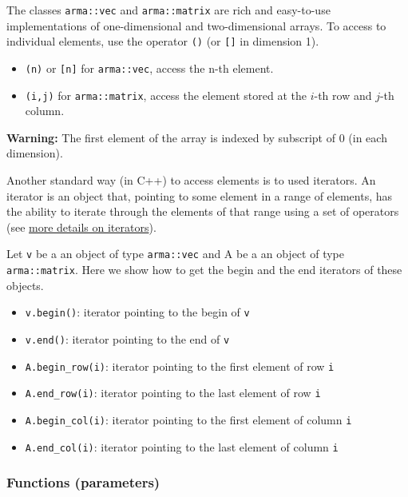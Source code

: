 The classes \texttt{arma::vec} and \texttt{arma::matrix} are rich and easy-to-use implementations of one-dimensional and two-dimensional arrays. To access to individual elements, use the operator \texttt{()} (or \texttt{{[}{]}} in dimension 1).

\begin{itemize}
\tightlist
\item
  \texttt{(n)} or \texttt{{[}n{]}} for \texttt{arma::vec}, access the n-th element.
\item
  \texttt{(i,j)} for \texttt{arma::matrix}, access the element stored at the \(i\)-th row and \(j\)-th column.
\end{itemize}

\textbf{Warning:} The first element of the array is indexed by subscript of 0 (in each dimension).

Another standard way (in C++) to access elements is to used iterators. An iterator is an object that, pointing to some element in a range of elements, has the ability to iterate through the elements of that range using a set of operators (see \href{https://teuder.github.io/rcpp4everyone_en/290_iterator.html}{more details on iterators}).

Let \texttt{v} be a an object of type \texttt{arma::vec} and A be a an object of type \texttt{arma::matrix}. Here we show how to get the begin and the end iterators of these objects.

\begin{itemize}
\tightlist
\item
  \texttt{v.begin()}: iterator pointing to the begin of \texttt{v}
\item
  \texttt{v.end()}: iterator pointing to the end of \texttt{v}
\item
  \texttt{A.begin\_row(i)}: iterator pointing to the first element of row \texttt{i}
\item
  \texttt{A.end\_row(i)}: iterator pointing to the last element of row \texttt{i}
\item
  \texttt{A.begin\_col(i)}: iterator pointing to the first element of column \texttt{i}
\item
  \texttt{A.end\_col(i)}: iterator pointing to the last element of column \texttt{i}
\end{itemize}

\hypertarget{functions-parameters}{%
\subsubsection{Functions (parameters)}\label{functions-parameters}}

